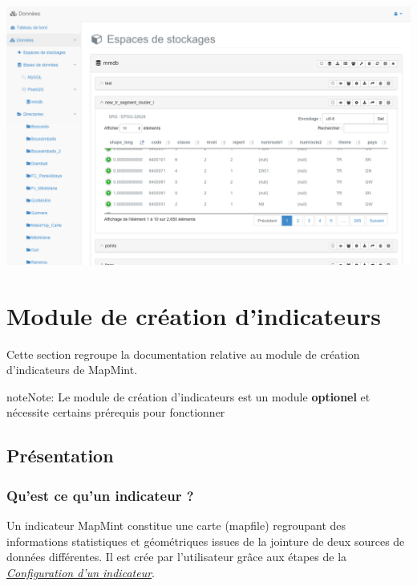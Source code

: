 \documentclass[letterpaper,10pt,french]{sphinxmanual}
\begin{document}
\includegraphics[width=1.000\linewidth]{data-module-preview.png}


\chapter{Module de création d'indicateurs}
\label{indicators/index:indicators}\label{indicators/index::doc}\label{indicators/index:module-de-creation-d-indicateurs}
Cette section regroupe la documentation relative au module de création d'indicateurs de MapMint.

\begin{notice}{note}{Note:}
Le module de création d'indicateurs est un module \textbf{optionel} et nécessite certains prérequis pour fonctionner
\end{notice}


\section{Présentation}
\label{indicators/presentation:indicators-presentation}\label{indicators/presentation:presentation}\label{indicators/presentation::doc}

\subsection{Qu'est ce qu'un indicateur ?}
\label{indicators/presentation:qu-est-ce-qu-un-indicateur}
Un indicateur MapMint constitue une carte (mapfile) regroupant des
informations statistiques et géométriques issues de la jointure de deux
sources de données différentes. Il est crée par l'utilisateur grâce
aux étapes de la {\hyperref[indicators/indicatorspanel::doc]{\emph{\emph{Configuration d'un indicateur}}}}.
\end{document}
